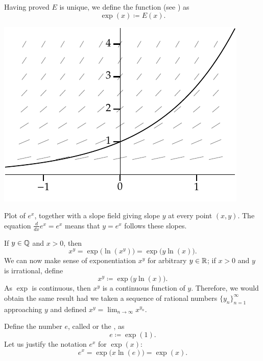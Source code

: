 Having proved $E$ is unique, we define the
\emph{} function (see ) as
\begin{equation*}
\exp(x) \coloneqq E(x) .
\end{equation*}
\begin{myfigureht}
\includegraphics{figures/expfig}
\caption{Plot of $e^x$, together with a slope field giving slope $y$ at
every point $(x,y)$.
The equation $\frac{d}{dx} e^x = e^x$ means that $y=e^x$ follows these slopes.\label{fig:exp}}
\end{myfigureht}

If $y \in {\mathbb{Q}}$ and $x > 0$, then
\begin{equation*}
x^y = \exp\bigl(\ln(x^y)\bigr) = \exp\bigl(y\ln(x)\bigr) .
\end{equation*}
We can now make sense of exponentiation $x^y$ for arbitrary $y \in {\mathbb{R}}$;
if $x > 0$ and $y$ is irrational, define
\begin{equation*}
x^y \coloneqq \exp\bigl(y\ln(x)\bigr) .
\end{equation*}
As $\exp$ is continuous, then $x^y$ is a continuous function of $y$.
Therefore, we would
obtain the same result had we taken a sequence of rational numbers
$\{ y_n \}_{n=1}^\infty$
approaching $y$ and defined $x^y = \lim_{n\to\infty} x^{y_n}$.

Define the number $e$,
called \emph{} or
the \emph{}, as
\begin{equation*}
e \coloneqq \exp(1) .
\end{equation*}
Let us justify the notation $e^x$ for $\exp(x)$:
\begin{equation*}
e^x = \exp\bigl(x \ln(e) \bigr) = \exp(x) .
\end{equation*}

